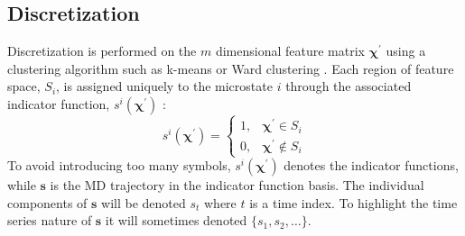 \subsection{Discretization}
Discretization is performed on the $m$ dimensional feature matrix $\bm{\chi}^{\prime}$ using a clustering algorithm such as k-means or Ward clustering \cite{husicWardClusteringImproves2017a}. Each region of feature space, $S_{i}$, is assigned uniquely to the microstate $i$ through the associated indicator function, $s^{i}\left(\bm{\chi}^{\prime}\right)$ \cite{prinzMarkovModelsMolecular2011}:
\begin{equation}
s^{i}\left(\bm{\chi}^{\prime}\right)=\left\{\begin{array}{ll}
1, & \bm{\chi}^{\prime} \in S_{i} \\
0, & \bm{\chi}^{\prime} \notin S_{i}
\end{array}\right.
\end{equation}
To avoid introducing too many symbols, $s^{i}\left(\bm{\chi}^{\prime}\right)$ denotes the indicator functions, while $\mathbf{s}$ is the MD trajectory in the indicator function basis. The individual components of $\mathbf{s}$ will be denoted $s_{t}$ where $t$ is a time index. To highlight the time series nature of $\mathbf{s}$ it will sometimes denoted $\{s_{1}, s_{2}, \ldots \}$. 

